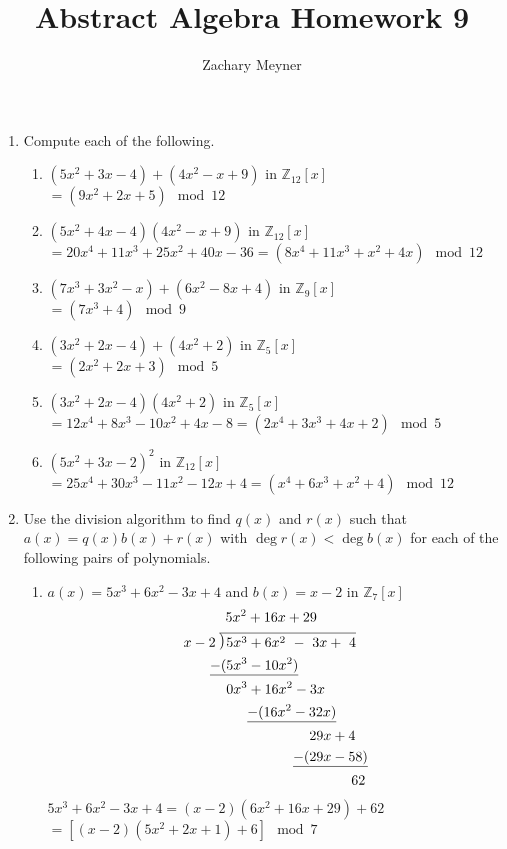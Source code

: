 \documentclass[12pt]{article}
\title{\large Abstract Algebra Homework 9}
\author{\large Zachary Meyner}
\date{}
\newcommand\setitemnumber[1]{\setcounter{enumi}{\numexpr#1-- -1\relax}}
\newcommand\Mydiv[2]{%
$\strut#1$\kern.25em\smash{\raise.3ex\hbox{$\big)$}}$\mkern-8mu
        \overline{\enspace\strut#2}$}
\begin{document}
\maketitle
\begin{enumerate}[label=\textbf{\arabic*}.]
	\setitemnumber{2}
	\item Compute each of the following.
	      \begin{enumerate}
		      \item $(5x^2+3x-4)+(4x^2-x+9)$ in $\mathbb{Z}_{12}[x]$ \\
		            $=(9x^2+2x+5) \mod{12}$
		      \item $(5x^2+4x-4)(4x^2-x+9)$ in $\mathbb{Z}_{12}[x]$ \\
		            $=20x^4+11x^3+25x^2+40x-36 = (8x^4+11x^3+x^2+4x) \mod{12}$
		      \item $(7x^3+3x^2-x) + (6x^2-8x+4)$ in $\mathbb{Z}_{9}[x]$ \\
		            $=(7x^3+4) \mod{9}$
		      \item $(3x^2+2x-4) + (4x^2+2)$ in $\mathbb{Z}_{5}[x]$ \\
		            $=(2x^2+2x+3) \mod{5}$
		      \item $(3x^2+2x-4)(4x^2+2)$ in $\mathbb{Z}_{5}[x]$ \\
		            $=12x^4+8x^3-10x^2+4x-8 = (2x^4+3x^3+4x+2) \mod{5}$
		      \item ${(5x^2+3x-2)}^2$ in $\mathbb{Z}_{12}[x]$ \\
		            $=25x^4+30x^3-11x^2-12x+4 = (x^4+6x^3+x^2+4) \mod{12}$
	      \end{enumerate}

	      \setitemnumber{3}
	\item Use the division algorithm to find $q(x)$ and $r(x)$ such that $a(x) = q(x)b(x) + r(x)$ with
	      $\deg r(x) < \deg b(x)$ for each of the following pairs of polynomials.
	      \begin{enumerate}
		      \item $a(x) = 5x^3+6x^2-3x+4$ and $b(x) = x-2$ in $\mathbb{Z}_{7}[x]$
		            \begin{align*}
			             & \qquad \quad 5x^2+16x+29                                   \\
			             & \text{\Mydiv{x-2}{5x^3+6x^2\ -\ 3x+ \ 4}}                  \\
			             & \quad \ \ \: \underline{-(5x^3-10x^2)}                     \\
			             & \qquad \quad \: \! 0x^3+16x^2 -3x                          \\
			             & \qquad \qquad \; \; \underline{-(16x^2-32x)}               \\
			             & \qquad \qquad \qquad \qquad \quad 29x+4                    \\
			             & \qquad \qquad \qquad \qquad \, \! \! \underline{-(29x-58)} \\
			             & \qquad \qquad \qquad \qquad \qquad \qquad 62
		            \end{align*}
		            $5x^3+6x^2-3x+4 = (x-2)(6x^2+16x+29) + 62$ \\
		            $=[(x-2)(5x^2+2x+1) + 6] \mod{7}$


\end{enumerate}
\end{enumerate}
\end{document}
